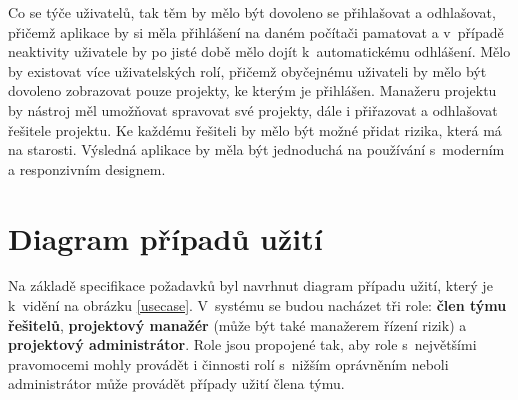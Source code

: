 Co se týče uživatelů, tak těm by mělo být dovoleno se přihlašovat a odhlašovat, přičemž aplikace by si měla přihlášení na daném počítači pamatovat a v~případě neaktivity uživatele by po jisté době mělo dojít k~automatickému odhlášení. Mělo by existovat více uživatelských rolí, přičemž obyčejnému uživateli by mělo být dovoleno zobrazovat pouze projekty, ke kterým je přihlášen. Manažeru projektu by nástroj měl umožňovat spravovat své projekty, dále i přiřazovat a odhlašovat řešitele projektu. Ke každému řešiteli by mělo být možné přidat rizika, která má na starosti.
Výsledná aplikace by měla být jednoduchá na používání s~moderním a responzivním designem.

\section{Diagram případů užití}

Na základě specifikace požadavků byl navrhnut diagram případu užití, který je k~vidění na obrázku \ref{usecase}. V~systému se budou nacházet tři role: \textbf{člen týmu řešitelů}, \textbf{projektový manažér} (může být také manažerem řízení rizik) a \textbf{projektový administrátor}. Role jsou propojené tak, aby role s~největšími pravomocemi mohly provádět i činnosti rolí s~nižším oprávněním neboli administrátor může provádět případy užití člena týmu.

